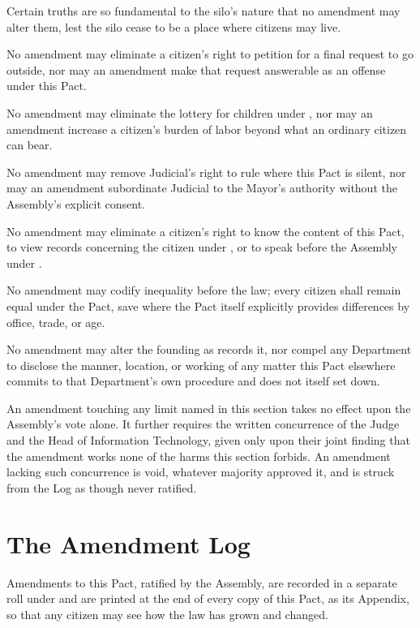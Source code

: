 Certain truths are so fundamental to the silo's nature that no amendment may alter them, lest the silo cease to be a place where citizens may live.

\begin{clauses}
\item No amendment may eliminate a citizen's right to petition for a final request to go outside, nor may an amendment make that request answerable as an offense under this Pact.
\item No amendment may eliminate the lottery for children under , nor may an amendment increase a citizen's burden of labor beyond what an ordinary citizen can bear.
\item No amendment may remove Judicial's right to rule where this Pact is silent, nor may an amendment subordinate Judicial to the Mayor's authority without the Assembly's explicit consent.
\item No amendment may eliminate a citizen's right to know the content of this Pact, to view records concerning the citizen under , or to speak before the Assembly under .
\item No amendment may codify inequality before the law; every citizen shall remain equal under the Pact, save where the Pact itself explicitly provides differences by office, trade, or age.
\item No amendment may alter the founding as  records it, nor compel any Department to disclose the manner, location, or working of any matter this Pact elsewhere commits to that Department's own procedure and does not itself set down.
\item An amendment touching any limit named in this section takes no effect upon the Assembly's vote alone. It further requires the written concurrence of the Judge and the Head of Information Technology, given only upon their joint finding that the amendment works none of the harms this section forbids. An amendment lacking such concurrence is void, whatever majority approved it, and is struck from the Log as though never ratified.
\end{clauses}

\section{The Amendment Log}
\label{sec:amendment:amendment-log}

Amendments to this Pact, ratified by the Assembly, are recorded in a separate roll under  and are printed at the end of every copy of this Pact, as its Appendix, so that any citizen may see how the law has grown and changed.

